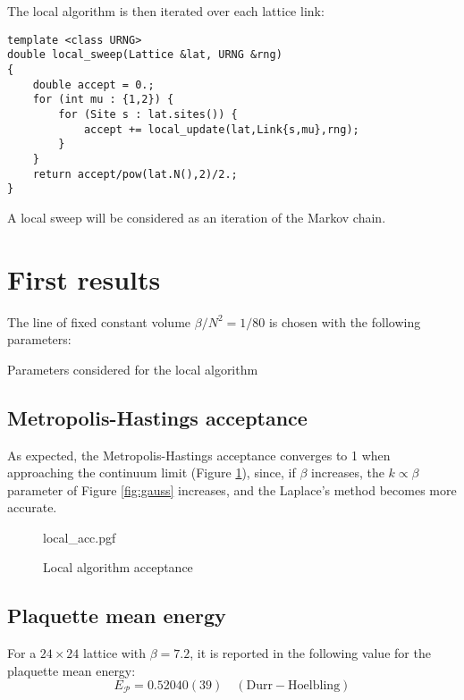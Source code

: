 The local algorithm is then iterated over each lattice link:
\begin{lstlisting}[caption={Local sweep}]
template <class URNG>
double local_sweep(Lattice &lat, URNG &rng)
{
    double accept = 0.;
    for (int mu : {1,2}) {
        for (Site s : lat.sites()) {
            accept += local_update(lat,Link{s,mu},rng);
        }
    }
    return accept/pow(lat.N(),2)/2.;
}
\end{lstlisting}
A local sweep will be considered as an iteration of the Markov chain.

\section{First results}

The line of fixed constant volume $\beta/N^2=1/80$ is chosen with the following parameters:

\begin{table}[!htb]
    \centering
    
    \caption{Parameters considered for the local algorithm}
    \label{tab:local_cont}
\end{table}

\subsection*{Metropolis-Hastings acceptance}

As expected, the Metropolis-Hastings acceptance converges to 1 when approaching the continuum limit (Figure \ref{fig:local_acc}),
since, if $\beta$ increases, the $k\propto\beta$ parameter of Figure \ref{fig:gauss} increases, and the Laplace's method becomes more accurate.

\begin{figure}[!htb]
    \centering
    {local_acc.pgf}
    \caption{Local algorithm acceptance}
    \label{fig:local_acc}
\end{figure}

\subsection*{Plaquette mean energy}
For a $24\times24$ lattice with $\beta=7.2$, it is reported in \cite{durr-hoelbling:2005} the following value for the plaquette mean energy:
\begin{equation}\label{eq:plaq_durr}
    E_{\mathcal P} = 0.52040(39) \quad \mathrm{(Durr-Hoelbling)}
\end{equation}

